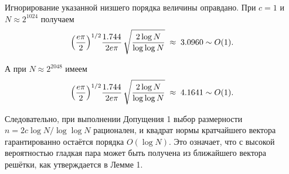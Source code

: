 Игнорирование указанной низшего порядка величины оправдано. При $c=1$ и
$N\approx 2^{1024}$ получаем
\begin{equation}
  \Bigl(\frac{e\pi}{2}\Bigr)^{1/2}
  \frac{1.744}{2e\pi}\,
  \sqrt{\frac{2\log N}{\log\log N}}
  \;\approx\; 3.0960 \sim O(1).
\end{equation}

\noindent А при $N\approx 2^{2048}$ имеем
\begin{equation}
  \Bigl(\frac{e\pi}{2}\Bigr)^{1/2}
  \frac{1.744}{2e\pi}\,
  \sqrt{\frac{2\log N}{\log\log N}}
  \;\approx\; 4.1641 \sim O(1).
\end{equation}

\noindent Следовательно, при выполнении Допущения 1 выбор размерности $n=2c\log
N/\log\log N$ рационален, и квадрат нормы кратчайшего вектора гарантированно
остаётся порядка $O(\log N)$. Это означает, что с высокой вероятностью гладкая
пара может быть получена из ближайшего вектора решётки, как утверждается
в Лемме 1.

